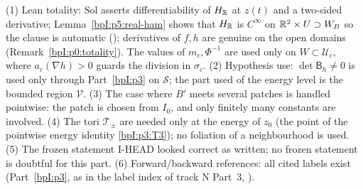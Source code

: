 \begin{remark}\label{bpI:p5:doubts}
(1) Lean totality: $\mathrm{Sol}$ asserts differentiability of $H_{\mathbb{R}}$ at $z(t)$ and a two-sided derivative; Lemma~\ref{bpI:p5:real-ham} shows that $H_{\mathbb{R}}$ is $C^\infty$ on $\mathbb{R}^2\times U\supset W_B$ so the clause is automatic (); derivatives of $f,h$ are genuine on the open domains (Remark~\ref{bpI:p0:totality}). The values of $m_c,\Phi^{-1}$ are used only on $W\subset\mathcal U_c$, where $a_c(\nabla h)>0$ guards the division in $\sigma_c$.
(2) Hypothesis use: $\det\mathsf B_h\ne0$ is used only through Part~\ref{bpI:p3} on $\mathcal S$; the part used of the energy level is the bounded region $\mathcal V$.
(3) The case where $\overline{B'}$ meets several patches is handled pointwise: the patch is chosen from $I_0$, and only finitely many constants are involved.
(4) The tori $\mathcal T_\pm$ are needed only at the energy of $z_0$ (the point of the pointwise energy identity \ref{bpI:p3:T3}); no foliation of a neighbourhood is used.
(5) The frozen statement I-HEAD looked correct as written; no frozen statement is doubtful for this part.
(6) Forward/backward references: all cited labels exist (Part~\ref{bpI:p3},  as in the label index of track N Part~3, ).
\end{remark}
